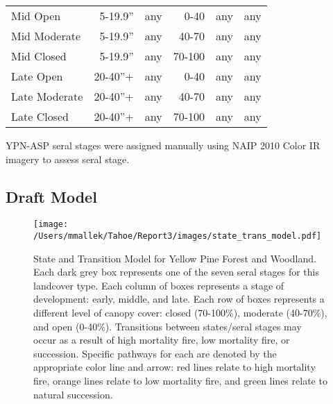 \begin{table}[]
\begin{tabular}{@{}lrrrrr@{}}
Mid Open         & 5-19.9''        & any & 0-40   & any & any \\
Mid Moderate     & 5-19.9''        & any & 40-70  & any & any \\
Mid Closed       & 5-19.9''        & any & 70-100 & any & any \\
Late Open        & 20-40''+        & any & 0-40   & any & any \\
Late Moderate    & 20-40''+        & any & 40-70  & any & any \\
Late Closed      & 20-40''+        & any & 70-100 & any & any \\ \bottomrule
\end{tabular}
\end{table}

YPN-ASP seral stages were assigned manually using NAIP 2010 Color IR imagery to assess seral stage.

\subsection*{Draft Model}
\begin{figure}[htbp]
\centering
\texttt{[image: /Users/mmallek/Tahoe/Report3/images/state\_trans\_model.pdf]}
\caption{State and Transition Model for Yellow Pine Forest and Woodland. Each dark grey box represents one of the seven seral stages for this landcover type. Each column of boxes represents a stage of development: early, middle, and late. Each row of boxes represents a different level of canopy cover: closed (70-100\%), moderate (40-70\%), and open (0-40\%). Transitions between states/seral stages may occur as a result of high mortality fire, low mortality fire, or succession. Specific pathways for each are denoted by the appropriate color line and arrow: red lines relate to high mortality fire, orange lines relate to low mortality fire, and green lines relate to natural succession.} 
\label{transmodel}
\end{figure}

